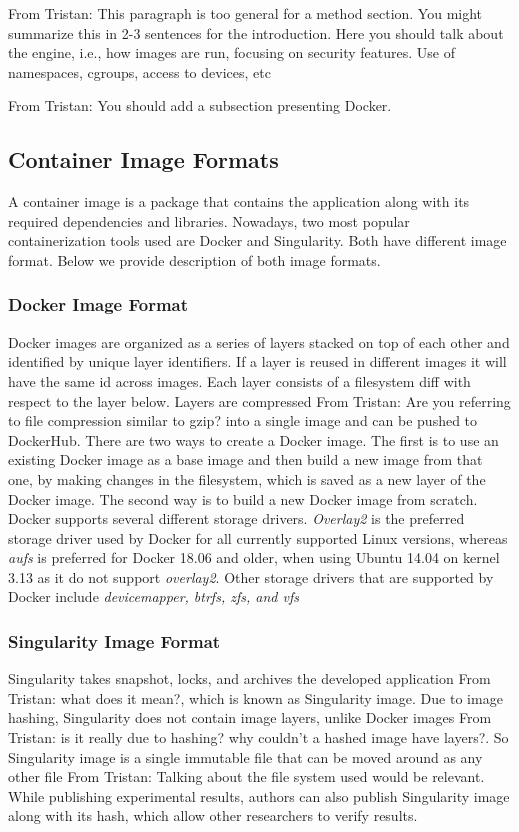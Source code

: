 \documentclass[a4paper,num-refs]{oup-contemporary}
\newcommand{\TG}[1]{\color{blue}From Tristan: #1\color{black}}
\begin{document}
\TG{This paragraph is too general for a method section. You might summarize this in
2-3 sentences for the introduction. Here you should talk about the engine,
i.e., how images are run, focusing on security features. Use of namespaces,
cgroups, access to devices, etc}

\TG{You should add a subsection presenting Docker.}

\subsection{Container Image Formats}

A container image is a package that contains the application along with its
required dependencies and libraries.
Nowadays, two most popular containerization tools used are Docker and Singularity.
Both have different image format. Below we provide description of both image
formats.

\subsubsection{Docker Image Format}

Docker images are organized as a series of layers stacked on top of each
other and identified by unique layer identifiers. If a layer is reused
in different images it will
have the same id across images. Each layer consists of a filesystem diff
with respect to the layer below. Layers are compressed \TG{Are you
referring to file compression similar to gzip?} into a single image and can
be pushed to DockerHub. There are two ways to create a Docker image. The
first is to use an existing Docker image as a base image and then build a
new image from that one, by making changes in the filesystem, which is
saved as a new layer of the Docker image. The second way is to build a new
Docker image from scratch. Docker supports several different storage drivers.
\textit{Overlay2} is the preferred storage driver used by Docker for all currently
supported Linux versions, whereas \textit{aufs} is preferred for Docker 18.06 and
older, when using Ubuntu 14.04 on kernel 3.13 as it do not support \textit{overlay2}.
Other storage drivers that are supported by Docker include \textit{devicemapper, btrfs,
zfs, and vfs}

\subsubsection{Singularity Image Format}

Singularity takes snapshot, locks, and archives the developed application
\TG{what does it mean?}, which is known as Singularity image. Due to image
hashing, Singularity does not contain image layers, unlike Docker images
\TG{is it really due to hashing? why couldn't a hashed image have layers?}.
So Singularity image is a single immutable file that can be moved around as
any other file \TG{Talking about the file system used would be relevant}.
While publishing experimental results, authors can also publish Singularity
image along with its hash, which allow other researchers to verify results.
\end{document}
